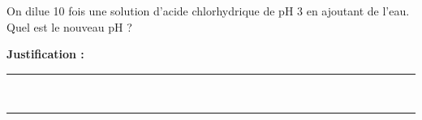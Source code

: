 On dilue \num{10} fois une solution d'acide chlorhydrique de pH \num{3} en ajoutant de l'eau. Quel est le nouveau pH ?

\choices

\noindent\textbf{Justification :} \hrulefill \\[2.5ex]
\rule{\linewidth}{0.4pt} \\[2.5ex]
\rule{\linewidth}{0.4pt}
\vfill
